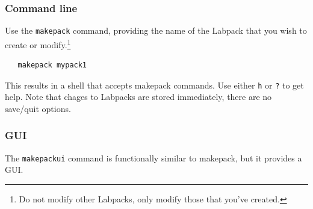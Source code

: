 \documentclass[12pt]{article}
\begin{document}
\subsubsection{Command line}
Use the {\tt makepack} command, providing the name of the Labpack that you wish
to create or modify.\footnote{Do not modify other Labpacks, only modify those that you've created.}  
\begin{verbatim}
   makepack mypack1
\end{verbatim}

\noindent This results in a shell that accepts makepack commands.  Use either {\tt h} or {\tt ?} to get help.  
Note that chages to Labpacks are stored immediately, there are no save/quit options.

\subsubsection{GUI}
The {\tt makepackui} command is functionally similar to makepack, but it provides a GUI.
\end{document}
